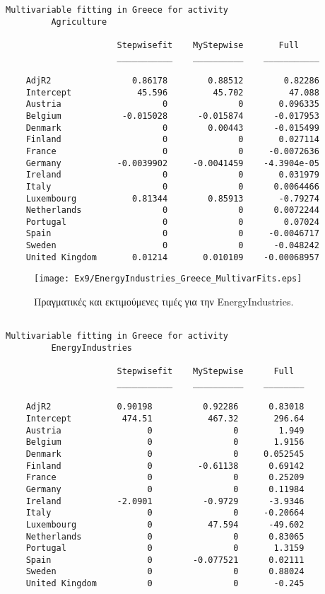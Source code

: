 \documentclass[11pt]{scrartcl} %
\begin{document}
\begin{Verbatim}[fontsize=\small]
Multivariable fitting in Greece for activity
 	 	 Agriculture

                      Stepwisefit    MyStepwise       Full    
                      ___________    __________    ___________

    AdjR2                0.86178        0.88512        0.82286
    Intercept             45.596         45.702         47.088
    Austria                    0              0       0.096335
    Belgium            -0.015028      -0.015874      -0.017953
    Denmark                    0        0.00443      -0.015499
    Finland                    0              0       0.027114
    France                     0              0     -0.0072636
    Germany           -0.0039902     -0.0041459    -4.3904e-05
    Ireland                    0              0       0.031979
    Italy                      0              0      0.0064466
    Luxembourg           0.81344        0.85913       -0.79274
    Netherlands                0              0      0.0072244
    Portugal                   0              0        0.07024
    Spain                      0              0     -0.0046717
    Sweden                     0              0      -0.048242
    United Kingdom       0.01214       0.010109    -0.00068957
\end{Verbatim}




\begin{figure}[H]

	\centering
	\texttt{[image: Ex9/EnergyIndustries\_Greece\_MultivarFits.eps]}	
\caption{Πραγματικές και εκτιμούμενες τιμές για την EnergyIndustries.}
\label{fig:z92} 
\end{figure}



\begin{Verbatim}[fontsize=\small]

Multivariable fitting in Greece for activity
 	 	 EnergyIndustries
 	 	 
                      Stepwisefit    MyStepwise      Full  
                      ___________    __________    ________

    AdjR2             0.90198          0.92286      0.83018
    Intercept          474.51           467.32       296.64
    Austria                 0                0        1.949
    Belgium                 0                0       1.9156
    Denmark                 0                0     0.052545
    Finland                 0         -0.61138      0.69142
    France                  0                0      0.25209
    Germany                 0                0      0.11984
    Ireland           -2.0901          -0.9729      -3.9346
    Italy                   0                0     -0.20664
    Luxembourg              0           47.594      -49.602
    Netherlands             0                0      0.83065
    Portugal                0                0       1.3159
    Spain                   0        -0.077521      0.02111
    Sweden                  0                0      0.88024
    United Kingdom          0                0       -0.245
\end{Verbatim}
\end{document}
